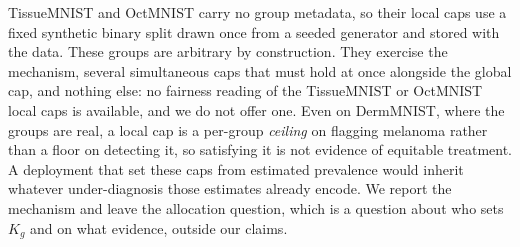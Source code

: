 \documentclass[10pt]{article}
\begin{document}
TissueMNIST and OctMNIST carry no group metadata, so their local caps
use a fixed synthetic binary split drawn once from a seeded generator
and stored with the data. These groups are arbitrary by construction.
They exercise the mechanism, several simultaneous caps that must hold
at once alongside the global cap, and nothing else: no fairness
reading of the TissueMNIST or OctMNIST local caps is available, and we
do not offer one. Even on DermMNIST, where the groups are real, a
local cap is a per-group \emph{ceiling} on flagging melanoma rather
than a floor on detecting it, so satisfying it is not evidence of
equitable treatment. A deployment that set these caps from estimated
prevalence would inherit whatever under-diagnosis those estimates
already encode. We report the mechanism and leave the allocation
question, which is a question about who sets $K_g$ and on what
evidence, outside our claims.
\end{document}

